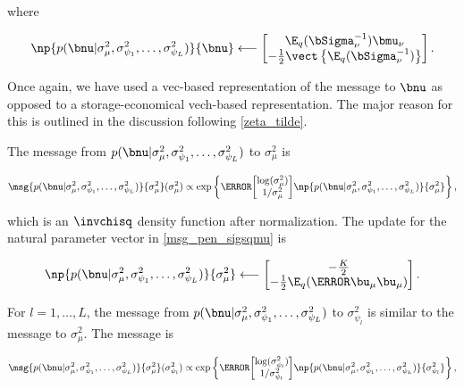 \documentclass[12pt]{article}
\def\Sigmanu{\bSigma_{\nu}}
\def\munu{\bmu_{\nu}}
\def\sigsqmu{\sigma^2_{\mu}}
\def\umu{\bu_\mu}
\newcommand\sigsqpsi[1]{\sigma^2_{\psi_{#1}}}
\theoremstyle{plain}
\theoremstyle{definition}
\theoremstyle{remark}
\begin{document}
\noindent where

\begin{equation}
	\np{p (\bnu | \sigsqmu, \sigsqpsi{1}, \dots, \sigsqpsi{L})}{\bnu}
		\longleftarrow
			\begin{bmatrix}
				\E_q (\Sigmanu^{-1}) \munu \\
				-\frac12 \vect \left\{ \E_q (\Sigmanu^{-1}) \right\}
			\end{bmatrix}.
\label{np_pen_nu}
\end{equation}

\noindent Once again, we have used a vec-based representation of the message to $\bnu$ as opposed to
a storage-economical vech-based representation. The major reason for this is outlined in the discussion following
\eqref{zeta_tilde}.

The message from $p (\bnu | \sigsqmu, \sigsqpsi{1}, \dots, \sigsqpsi{L})$ to $\sigsqmu$ is

\begin{equation}
	\msg{p (\bnu | \sigsqmu, \sigsqpsi{1}, \dots, \sigsqpsi{L})}{\sigsqmu} (\sigsqmu)
		\propto
			\exp \left\{
				\T{\begin{bmatrix}
					\log (\sigsqmu) \\
					1/\sigsqmu
				\end{bmatrix}} 
				\np{p (\bnu | \sigsqmu, \sigsqpsi{1}, \dots, \sigsqpsi{L})}{\sigsqmu}
			\right\},
\label{msg_pen_sigsqmu}
\end{equation}

\noindent which is an $\invchisq$ density function after normalization. The update for the natural parameter vector
in \eqref{msg_pen_sigsqmu} is

\begin{equation}
	\np{p (\bnu | \sigsqmu, \sigsqpsi{1}, \dots, \sigsqpsi{L})}{\sigsqmu}
		\longleftarrow
			\begin{bmatrix}
				-\frac{K}{2} \\
				-\frac12 \E_q (\T{\umu} \umu)
			\end{bmatrix}.
\label{np_pen_sigsqmu}
\end{equation}

For $l = 1, \dots, L$, the message from $p (\bnu | \sigsqmu, \sigsqpsi{1}, \dots, \sigsqpsi{L})$ to $\sigsqpsi{l}$
is similar to the message to $\sigsqmu$. The message is

\begin{equation}
	\msg{p (\bnu | \sigsqmu, \sigsqpsi{1}, \dots, \sigsqpsi{L})}{\sigsqmu} (\sigsqpsi{l})
		\propto
			\exp \left\{
				\T{\begin{bmatrix}
					\log (\sigsqpsi{l}) \\
					1/\sigsqpsi{l}
				\end{bmatrix}} 
				\np{p (\bnu | \sigsqmu, \sigsqpsi{1}, \dots, \sigsqpsi{L})}{\sigsqpsi{l}}
			\right\},
\label{msg_pen_sigsqpsi}
\end{equation}
\end{document}
